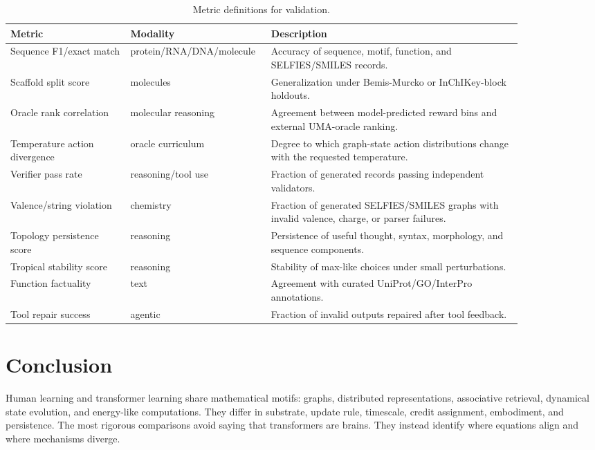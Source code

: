 \documentclass[11pt]{article}
\newcommand{\1}{\mathbf{1}}
\begin{document}
{\scriptsize
\setlength{\tabcolsep}{3pt}
\begin{longtable}{p{0.22\linewidth}p{0.18\linewidth}p{0.46\linewidth}}
\caption{Metric definitions for validation.}\\
\toprule
Metric & Modality & Description \\
\midrule
\endhead
Sequence F1/exact match & protein/RNA/DNA/molecule & Accuracy of sequence, motif, function, and SELFIES/SMILES records. \\
Scaffold split score & molecules & Generalization under Bemis-Murcko or InChIKey-block holdouts. \\
Oracle rank correlation & molecular reasoning & Agreement between model-predicted reward bins and external UMA-oracle ranking. \\
Temperature action divergence & oracle curriculum & Degree to which graph-state action distributions change with the requested temperature. \\
Verifier pass rate & reasoning/tool use & Fraction of generated records passing independent validators. \\
Valence/string violation & chemistry & Fraction of generated SELFIES/SMILES graphs with invalid valence, charge, or parser failures. \\
Topology persistence score & reasoning & Persistence of useful thought, syntax, morphology, and sequence components. \\
Tropical stability score & reasoning & Stability of max-like choices under small perturbations. \\
Function factuality & text & Agreement with curated UniProt/GO/InterPro annotations. \\
Tool repair success & agentic & Fraction of invalid outputs repaired after tool feedback. \\
\bottomrule
\end{longtable}}
\section{Conclusion}

Human learning and transformer learning share mathematical motifs: graphs, distributed representations, associative retrieval, dynamical state evolution, and energy-like computations. They differ in substrate, update rule, timescale, credit assignment, embodiment, and persistence. The most rigorous comparisons avoid saying that transformers are brains. They instead identify where equations align and where mechanisms diverge.
\end{document}
